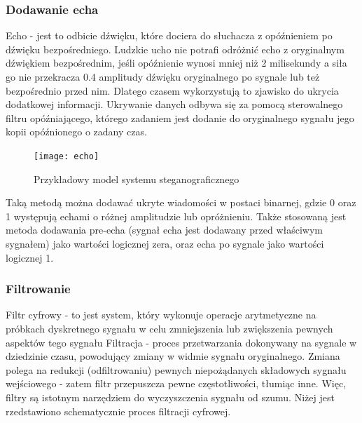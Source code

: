 \documentclass[a4paper,titleauthor]{mwart}
\begin{document}
	\subsubsection{Dodawanie echa}
	Echo - jest to odbicie dźwięku, które dociera do słuchacza z opóźnieniem po dźwięku bezpośredniego.
	\newline\newline
	Ludzkie ucho nie potrafi odróżnić echo z oryginalnym dźwiękiem bezpośrednim, jeśli opóźnienie wynosi mniej niż 2 milisekundy a siła go nie przekracza 0.4 amplitudy dźwięku oryginalnego po sygnale lub też bezpośrednio przed nim.
	\newline\newline
	Dlatego czasem wykorzystują to zjawisko do ukrycia dodatkowej informacji. Ukrywanie danych odbywa się za pomocą sterowalnego filtru opóźniającego, którego zadaniem jest dodanie do oryginalnego sygnału jego kopii opóźnionego o zadany czas. 
	\newline\newline
	
	\begin{figure}[h]
		\centering
		\texttt{[image: echo]}
		\caption{Przykładowy model systemu steganograficznego}
	\end{figure}
	
	Taką metodą można dodawać ukryte wiadomości w postaci binarnej, gdzie 0 oraz 1 występują echami o różnej amplitudzie lub opróżnieniu. Także stosowaną jest metoda dodawania pre-echa (sygnał echa jest dodawany przed właściwym sygnałem) jako wartości logicznej zera, oraz echa po sygnale jako wartości logicznej 1. 
	\newline\newline
	
	\subsubsection{Filtrowanie}
	
	Filtr cyfrowy - to jest system, który wykonuje operacje arytmetyczne na próbkach dyskretnego sygnału w celu zmniejszenia lub zwiększenia pewnych aspektów tego sygnału
	\newline\newline
	Filtracja - proces przetwarzania dokonywany na sygnale w dziedzinie czasu, powodujący zmiany w widmie sygnału oryginalnego. Zmiana polega na redukcji (odfiltrowaniu) pewnych niepożądanych składowych sygnału wejściowego - zatem filtr przepuszcza pewne częstotliwości, tłumiąc inne. Więc, filtry są istotnym narzędziem do wyczyszczenia sygnału od szumu. Niżej jest rzedstawiono schematycznie proces filtracji cyfrowej.
	\newline\newline
	
\end{document}
